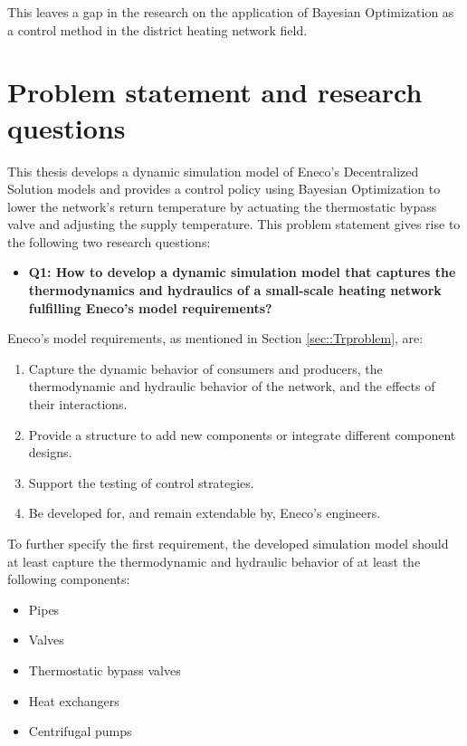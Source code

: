 This leaves a gap in the research on the application of Bayesian Optimization as a control method in the district heating network field.  

\section{Problem statement and research questions}\label{sec::researhqes}
This thesis develops a dynamic simulation model of Eneco's Decentralized Solution models and provides a control policy using Bayesian Optimization to lower the network's return temperature by actuating the thermostatic bypass valve and adjusting the supply temperature. This problem statement gives rise to the following two research questions:

\begin{itemize}
  \renewcommand\labelitemi{} %
    \item \textbf{Q1: How to develop a dynamic simulation model that captures the thermodynamics and hydraulics of a small-scale heating network fulfilling Eneco's model requirements?}
\end{itemize}

Eneco's model requirements, as mentioned in Section \ref{sec::Trproblem}, are:
\begin{enumerate}
    \item Capture the dynamic behavior of consumers and producers, the thermodynamic and hydraulic behavior of the network, and the effects of their interactions.
    \item Provide a structure to add new components or integrate different component designs.
    \item Support the testing of control strategies.
    \item Be developed for, and remain extendable by, Eneco's engineers. 
\end{enumerate}
To further specify the first requirement, the developed simulation model should at least capture the thermodynamic and hydraulic behavior of at least the following components:
\begin{itemize}
\item Pipes
\item Valves
\item Thermostatic bypass valves
\item Heat exchangers
\item Centrifugal pumps
\end{itemize}

